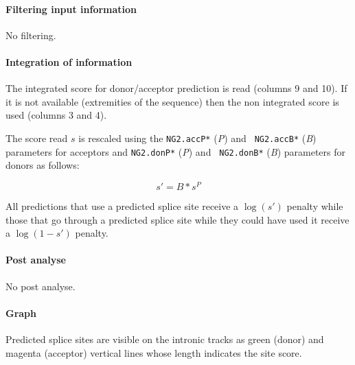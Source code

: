 \paragraph{Filtering input information}

No filtering.

\paragraph{Integration of information}

The integrated score for donor/acceptor prediction is read (columns 9
and 10). If it is not available (extremities of the sequence) then the
non integrated score is used (columns 3 and 4).

The score read $s$ is rescaled using the {\tt NG2.accP*} (\emph{P}) and {\tt
NG2.accB*} (\emph{B}) parameters for acceptors and {\tt NG2.donP*} (\emph{P}) and {\tt
NG2.donB*} (\emph{B}) parameters for donors as follows:

\[s' = B*s^P\]

All predictions that use a predicted splice site receive a $\log(s')$
penalty while those that go through a predicted splice site while they
could have used it receive a $\log(1-s')$ penalty.


\paragraph{Post analyse}

No post analyse.

\paragraph{Graph}

Predicted splice sites are visible on the intronic tracks as green
(donor) and magenta (acceptor) vertical lines whose length indicates
the site score.




